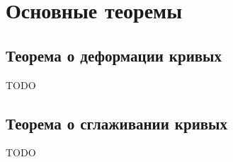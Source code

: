 \section{Основные теоремы}

\subsection*{Теорема о деформации кривых}

TODO

\subsection*{Теорема о сглаживании кривых}

TODO
